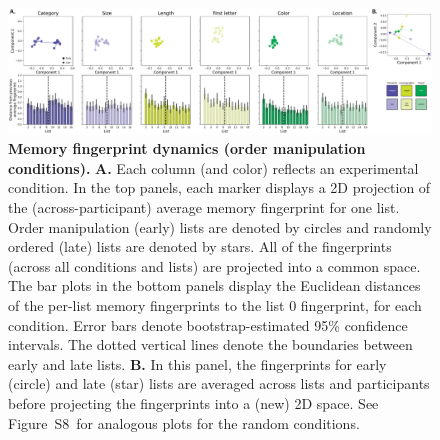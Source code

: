 \documentclass[11pt]{article}
\newcommand{\fingerprintTrajectoryRandom}{S8}
\begin{document}
\begin{figure}[tp] \centering
    \includegraphics[width=\textwidth]{figures/fingerprint_trajectories}

    \caption{\textbf{Memory fingerprint dynamics (order manipulation
    conditions).} \textbf{A.} Each column (and color) reflects an experimental
    condition. In the top panels, each marker displays a 2D projection of the
    (across-participant) average memory fingerprint for one list. Order
    manipulation (early) lists are denoted by circles and randomly ordered
    (late) lists are denoted by stars. All of the fingerprints (across all
    conditions and lists) are projected into a common space. The bar plots in
    the bottom panels display the Euclidean distances of the per-list memory
    fingerprints to the list 0 fingerprint, for each condition. Error bars
    denote bootstrap-estimated 95\% confidence intervals. The dotted vertical
    lines denote the boundaries between early and late lists. \textbf{B.} In
    this panel, the fingerprints for early (circle) and late (star) lists are
    averaged across lists and participants before projecting the fingerprints
    into a (new) 2D space. See Figure~\fingerprintTrajectoryRandom~for
    analogous plots for the random conditions. }
    \label{fig:fingerprint-trajectories}

    \end{figure}
\end{document}
